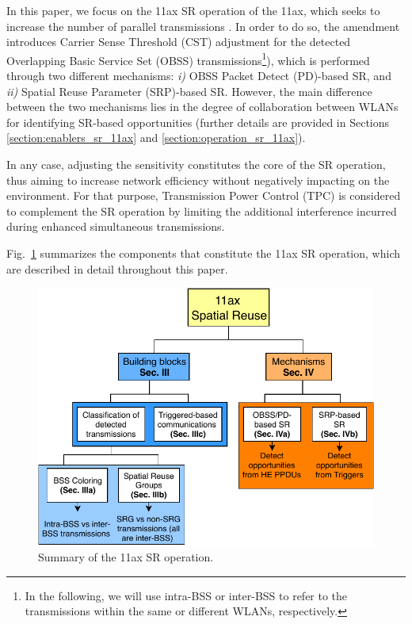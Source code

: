 \documentclass[comsoc]{IEEEtran}
\begin{document}
	In this paper, we focus on the 11ax SR operation of the 11ax, which seeks to increase the number of parallel transmissions \cite{merlin2009methods}. In order to do so, the amendment introduces Carrier Sense Threshold (CST) adjustment for the detected Overlapping Basic Service Set (OBSS) transmissions\footnote{In the following, we will use intra-BSS or inter-BSS to refer to the transmissions within the same or different WLANs, respectively.}), which is performed through two different mechanisms: \emph{i)} OBSS Packet Detect (PD)-based SR, and \emph{ii)} Spatial Reuse Parameter (SRP)-based SR. However, the main difference between the two mechanisms lies in the degree of collaboration between WLANs for identifying SR-based opportunities (further details are provided in Sections \ref{section:enablers_sr_11ax} and \ref{section:operation_sr_11ax}).
	
	In any case, adjusting the sensitivity constitutes the core of the SR operation, thus aiming to increase network efficiency without negatively impacting on the environment. For that purpose, Transmission Power Control (TPC) is considered to complement the SR operation by limiting the additional interference incurred during enhanced simultaneous transmissions. 
	
	Fig.~\ref{fig:sr_summary} summarizes the components that constitute the 11ax SR operation, which are described in detail throughout this paper.
	
	\begin{figure}[ht!]
		\centering
		\includegraphics[width=\columnwidth]{sr_summary}
		\caption{Summary of the 11ax SR operation.}
		\label{fig:sr_summary}
	\end{figure}
	
\end{document}
